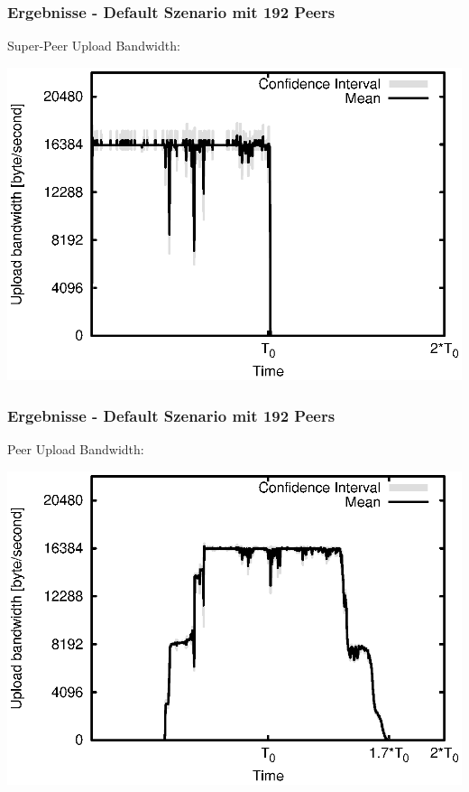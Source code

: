 \begin{frame}
  \frametitle{Ergebnisse - Default Szenario mit 192 Peers}
  Super-Peer Upload Bandwidth:
  
  \begin{center}
    \includegraphics[width=1\textwidth]{fig/plots/scenario_11_peer_count_192_v2/plots/GeneratedMeanCurrentSuperSeederUploadBandwidth.csv.eps}
  \end{center}
\end{frame}


\begin{frame}
  \frametitle{Ergebnisse - Default Szenario mit 192 Peers}
  Peer Upload Bandwidth:
  
  \begin{center}
    \includegraphics[width=1\textwidth]{fig/plots/scenario_11_peer_count_192_v2/plots/GeneratedMeanCurrentUploadBandwidth.csv.eps}
  \end{center}
\end{frame}


